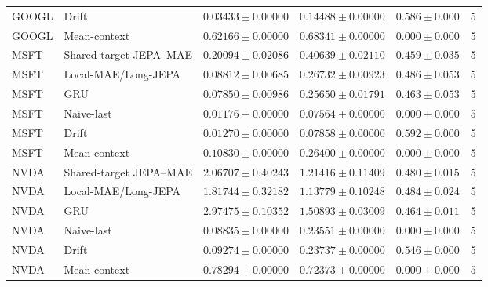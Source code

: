 \begin{longtable}{llrrrr}
GOOGL & Drift & $0.03433 \pm 0.00000$ & $0.14488 \pm 0.00000$ & $0.586 \pm 0.000$ & 5 \\
GOOGL & Mean-context & $0.62166 \pm 0.00000$ & $0.68341 \pm 0.00000$ & $0.000 \pm 0.000$ & 5 \\
MSFT & Shared-target JEPA--MAE & $0.20094 \pm 0.02086$ & $0.40639 \pm 0.02110$ & $0.459 \pm 0.035$ & 5 \\
MSFT & Local-MAE/Long-JEPA & $0.08812 \pm 0.00685$ & $0.26732 \pm 0.00923$ & $0.486 \pm 0.053$ & 5 \\
MSFT & GRU & $0.07850 \pm 0.00986$ & $0.25650 \pm 0.01791$ & $0.463 \pm 0.053$ & 5 \\
MSFT & Naive-last & $0.01176 \pm 0.00000$ & $0.07564 \pm 0.00000$ & $0.000 \pm 0.000$ & 5 \\
MSFT & Drift & $0.01270 \pm 0.00000$ & $0.07858 \pm 0.00000$ & $0.592 \pm 0.000$ & 5 \\
MSFT & Mean-context & $0.10830 \pm 0.00000$ & $0.26400 \pm 0.00000$ & $0.000 \pm 0.000$ & 5 \\
NVDA & Shared-target JEPA--MAE & $2.06707 \pm 0.40243$ & $1.21416 \pm 0.11409$ & $0.480 \pm 0.015$ & 5 \\
NVDA & Local-MAE/Long-JEPA & $1.81744 \pm 0.32182$ & $1.13779 \pm 0.10248$ & $0.484 \pm 0.024$ & 5 \\
NVDA & GRU & $2.97475 \pm 0.10352$ & $1.50893 \pm 0.03009$ & $0.464 \pm 0.011$ & 5 \\
NVDA & Naive-last & $0.08835 \pm 0.00000$ & $0.23551 \pm 0.00000$ & $0.000 \pm 0.000$ & 5 \\
NVDA & Drift & $0.09274 \pm 0.00000$ & $0.23737 \pm 0.00000$ & $0.546 \pm 0.000$ & 5 \\
NVDA & Mean-context & $0.78294 \pm 0.00000$ & $0.72373 \pm 0.00000$ & $0.000 \pm 0.000$ & 5 \\
\bottomrule
\end{longtable}
